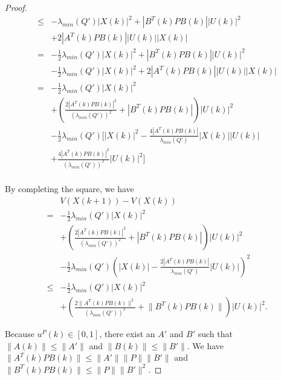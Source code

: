 \documentclass{sig-alternate}
\begin{document}
\begin{proof}
\begin{equation}
\begin{aligned}
\leq & - \lambda_{min}(Q') | X(k) |^{2}  + | B^{T}(k) P B(k) | | U(k) |^{2} \\
& + 2  | A^{T}(k) P B(k) | | U(k) | | X(k) | \\
= & - \frac{1}{2} \lambda_{min}(Q') | X(k) |^{2} + | B^{T}(k) P B(k) | | U(k) |^{2} \\
& - \frac{1}{2} \lambda_{min}(Q') | X(k) |^{2} + 2  | A^{T}(k) P B(k) | | U(k) | | X(k) |  \\
= & - \frac{1}{2} \lambda_{min}(Q') | X(k) |^{2} \\
& + \left( \frac{2 | A^{T}(k) P B(k) |^{2}}{ ( \lambda_{min}(Q') )^{2} } + | B^{T}(k) P B(k) |  \right) | U(k) |^{2} \\
& - \frac{1}{2} \lambda_{min}(Q') [ | X(k) |^{2} - \frac{4 | A^{T}(k) P B(k) | }{ \lambda_{min}(Q') }  | X(k) | | U(k) | \\
& + \frac{4 | A^{T}(k) P B(k) |^{2}}{ ( \lambda_{min}(Q') )^{2} } | U(k) |^{2} ] \\
\end{aligned}
\end{equation}
		
By completing the square, we have
\begin{equation}
\label{eq:lyapunov_delta4}
\begin{aligned}
& V( X(k+1) ) - V( X(k) ) \\
= & - \frac{1}{2} \lambda_{min}(Q') | X(k) |^{2} \\
& + \left( \frac{2 | A^{T}(k) P B(k) |^{2}}{ ( \lambda_{min}(Q') )^{2} } + | B^{T}(k) P B(k) | \right) | U(k) |^{2} \\
& - \frac{1}{2} \lambda_{min}(Q') \left( | X(k) | - \frac{2 | A^{T}(k) P B(k) | }{ \lambda_{min}(Q') } | U(k) | \right)^{2} \\
	\leq & - \frac{1}{2} \lambda_{min}(Q') | X(k) |^{2} \\
 &	+ \left( \frac{2 \lVert A^{T}(k) P B(k) \rVert^{2}}{ ( \lambda_{min}(Q') )^{2} } 
	 + \lVert B^{T}(k) P B(k) \rVert \right) | U(k) |^{2}. 
\end{aligned}
\end{equation}
		
Because $ u^{P}(k) \in [0, 1] $, there exist an $ A' $ and $ B' $ such that $ \lVert A(k) \rVert \leq \lVert A' \rVert $ and $ \lVert B(k) \rVert \leq \lVert B' \rVert $.
We have $ \lVert A^{T}(k) P B(k) \rVert \leq \lVert A' \rVert \lVert P \rVert \lVert B' \rVert $ and $ \lVert B^{T}(k) P B(k) \rVert \leq \lVert P \rVert \lVert B' \rVert^{2} $.
		

\end{proof}
\end{document}
